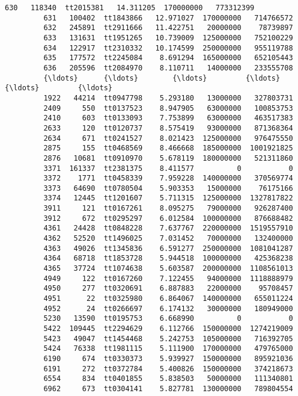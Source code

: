 \documentclass[11pt]{article}
\begin{document}
\begin{Verbatim}[commandchars=\\\{\}]
         630   118340  tt2015381   14.311205  170000000   773312399   
         631   100402  tt1843866   12.971027  170000000   714766572   
         632   245891  tt2911666   11.422751   20000000    78739897   
         633   131631  tt1951265   10.739009  125000000   752100229   
         634   122917  tt2310332   10.174599  250000000   955119788   
         635   177572  tt2245084    8.691294  165000000   652105443   
         636   205596  tt2084970    8.110711   14000000   233555708   
         {\ldots}      {\ldots}        {\ldots}         {\ldots}        {\ldots}         {\ldots}   
         1922   44214  tt0947798    5.293180   13000000   327803731   
         2409     550  tt0137523    8.947905   63000000   100853753   
         2410     603  tt0133093    7.753899   63000000   463517383   
         2633     120  tt0120737    8.575419   93000000   871368364   
         2634     671  tt0241527    8.021423  125000000   976475550   
         2875     155  tt0468569    8.466668  185000000  1001921825   
         2876   10681  tt0910970    5.678119  180000000   521311860   
         3371  161337  tt2381375    8.411577          0           0   
         3372    1771  tt0458339    7.959228  140000000   370569774   
         3373   64690  tt0780504    5.903353   15000000    76175166   
         3374   12445  tt1201607    5.711315  125000000  1327817822   
         3911     121  tt0167261    8.095275   79000000   926287400   
         3912     672  tt0295297    6.012584  100000000   876688482   
         4361   24428  tt0848228    7.637767  220000000  1519557910   
         4362   52520  tt1496025    7.031452   70000000   132400000   
         4363   49026  tt1345836    6.591277  250000000  1081041287   
         4364   68718  tt1853728    5.944518  100000000   425368238   
         4365   37724  tt1074638    5.603587  200000000  1108561013   
         4949     122  tt0167260    7.122455   94000000  1118888979   
         4950     277  tt0320691    6.887883   22000000    95708457   
         4951      22  tt0325980    6.864067  140000000   655011224   
         4952      24  tt0266697    6.174132   30000000   180949000   
         5230   13590  tt0195753    6.668990          0           0   
         5422  109445  tt2294629    6.112766  150000000  1274219009   
         5423   49047  tt1454468    5.242753  105000000   716392705   
         5424   76338  tt1981115    5.111900  170000000   479765000   
         6190     674  tt0330373    5.939927  150000000   895921036   
         6191     272  tt0372784    5.400826  150000000   374218673   
         6554     834  tt0401855    5.838503   50000000   111340801   
         6962     673  tt0304141    5.827781  130000000   789804554   
         

\end{Verbatim}
\end{document}
